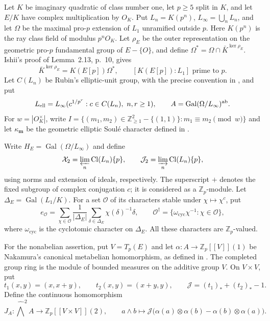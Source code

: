 \documentclass[11pt]{article}
\theoremstyle{definition}\newtheorem{definition}[theorem]{Definition}
\begin{document}
Let $K$ be imaginary quadratic of class number one, let $p\geq5$
split in $K$, and let $E/K$ have complex multiplication by $O_K$.
Put $L_n=K(p^n)$, $L_\infty=\bigcup_nL_n$, and let $\Omega$
be the maximal pro-$p$ extension of $L_1$ unramified outside $p$.
Here $K(p^n)$ is the ray class field of modulus $p^nO_K$.
Let $\rho_E$ be the outer representation on the geometric pro-$p$
fundamental group of $E-\{O\}$, and define
$\Omega^*=\Omega\cap\bar K^{\ker\rho_E}$.
Ishii's proof of Lemma~2.13, p.~10, gives
\[
 \bar K^{\ker\rho_E}=K(E[p])\Omega^*,\qquad
 [K(E[p]):L_1]\text{ prime to }p.
\]
Let $C(L_n)$ be Rubin's elliptic-unit group, with the precise
convention in \cite[Definition~2.2, p.~8]{IshiiSoule}, and put
\[
 L_{\rm ell}=L_\infty(c^{1/p^r}:c\in C(L_n),\ n,r\geq1),
 \qquad A=\operatorname{Gal}(\Omega/L_\infty)^{\rm ab}.
\]
For $w=|O_K^\times|$, write
$I=\{(m_1,m_2)\in\mathbb Z_{\geq1}^2-\{(1,1)\}:
 m_1\equiv m_2\pmod w\}$ and let $\kappa_{\boldsymbol m}$
be the geometric elliptic Soul\'e character defined in
\cite[Definition~1.1, p.~3]{IshiiSoule}.

Write $H_E=\operatorname{Gal}(\Omega/L_\infty)$ and define
\[
 \mathcal X_2=\varprojlim_n\operatorname{Cl}(L_n)\{p\},\qquad
 \mathcal J_2=\varinjlim_n\operatorname{Cl}(L_n)\{p\},
\]
using norms and extension of ideals, respectively.
The superscript $+$ denotes the fixed subgroup of complex conjugation
$c$; it is considered as a $\mathbb Z_p$-module.
Let $\Delta_E=\operatorname{Gal}(L_1/K)$.
For a set $\mathcal O$ of its characters stable under
$\chi\mapsto\chi^c$, put
\[
 e_{\mathcal O}=\sum_{\chi\in\mathcal O}
       \frac1{|\Delta_E|}\sum_{\delta\in\Delta_E}\chi(\delta)^{-1}\delta,
 \qquad
 \mathcal O^\dagger=\{\omega_{\mathrm{cyc}}\chi^{-1}:\chi\in\mathcal O\},
\]
where $\omega_{\mathrm{cyc}}$ is the cyclotomic character on $\Delta_E$.
All these characters are $\mathbb Z_p$-valued.

For the nonabelian assertion, put \(V=T_p(E)\) and let
\(\alpha:A\to\mathbb Z_p[[V]](1)\) be Nakamura's canonical
metabelian homomorphism, as defined in
\cite[Definition~2.5, p.~8]{Ishii}. The completed group
ring is the module of bounded measures on the additive group \(V\).
On \(V\times V\), put
\[
 t_1(x,y)=(x,x+y),\qquad t_2(x,y)=(x+y,y),\qquad
 \mathcal J=(t_1)_*+(t_2)_*-1.
\]
Define the continuous homomorphism
\[
 J_A:\widehat{\bigwedge}^2 A\longrightarrow
                    \mathbb Z_p[[V\times V]](2),\qquad
 a\wedge b\longmapsto
 \mathcal J\bigl(\alpha(a)\otimes\alpha(b)-\alpha(b)\otimes\alpha(a)\bigr).
\]
\end{document}
